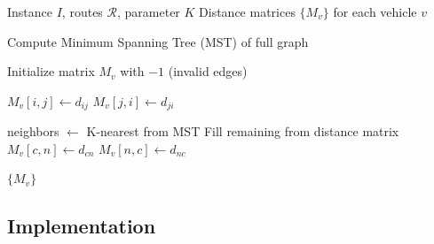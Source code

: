 \documentclass[12pt,a4paper]{article}
\theoremstyle{definition}
\begin{document}
\begin{algorithm}[H]
\caption{K-Nearest Neighbors Selection}
\begin{algorithmic}[1]
\Require Instance $I$, routes $\mathcal{R}$, parameter $K$
\Ensure Distance matrices $\{M_v\}$ for each vehicle $v$

\State Compute Minimum Spanning Tree (MST) of full graph

    \State Initialize matrix $M_v$ with $-1$ (invalid edges)
    
        \State $M_v[i,j] \gets d_{ij}$
        \State $M_v[j,i] \gets d_{ji}$
    \EndFor
    
        \State neighbors $\gets$ K-nearest from MST
            \State Fill remaining from distance matrix
        \EndIf
            \State $M_v[c,n] \gets d_{cn}$
            \State $M_v[n,c] \gets d_{nc}$
        \EndFor
    \EndFor
\EndFor

\State \Return $\{M_v\}$
\end{algorithmic}
\end{algorithm}

\subsection{Implementation}
\end{document}
